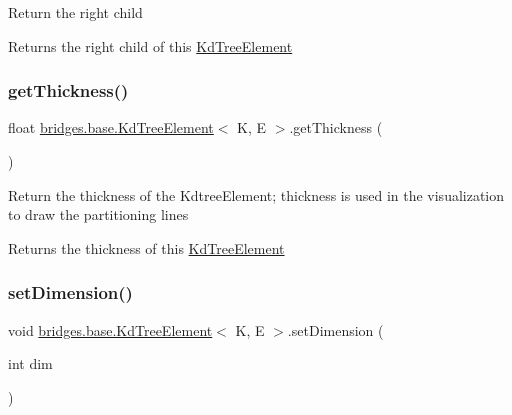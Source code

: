 Return the right child

\begin{DoxyReturn}{Returns}
the right child of this \mbox{\hyperlink{classbridges_1_1base_1_1_kd_tree_element}{Kd\+Tree\+Element}} 
\end{DoxyReturn}
\mbox{\label{classbridges_1_1base_1_1_kd_tree_element_a27c0b086af284210855ee5f1c90e7484}} 
\subsubsection{\texorpdfstring{getThickness()}{getThickness()}}
{\footnotesize\ttfamily float \mbox{\hyperlink{classbridges_1_1base_1_1_kd_tree_element}{bridges.\+base.\+Kd\+Tree\+Element}}$<$ K, E $>$.get\+Thickness (\begin{DoxyParamCaption}{ }\end{DoxyParamCaption})}

Return the thickness of the Kdtree\+Element; thickness is used in the visualization to draw the partitioning lines

\begin{DoxyReturn}{Returns}
the thickness of this \mbox{\hyperlink{classbridges_1_1base_1_1_kd_tree_element}{Kd\+Tree\+Element}} 
\end{DoxyReturn}
\mbox{\label{classbridges_1_1base_1_1_kd_tree_element_af3fa89cbd20fc2c3f30784db16b6dec4}} 
\subsubsection{\texorpdfstring{setDimension()}{setDimension()}}
{\footnotesize\ttfamily void \mbox{\hyperlink{classbridges_1_1base_1_1_kd_tree_element}{bridges.\+base.\+Kd\+Tree\+Element}}$<$ K, E $>$.set\+Dimension (\begin{DoxyParamCaption}\item[{int}]{dim }\end{DoxyParamCaption})}

